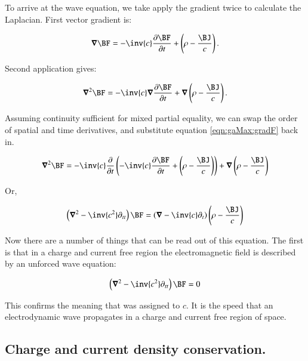 To arrive at the wave equation, we take apply the gradient twice to calculate the Laplacian.  First vector gradient is:

\begin{equation}\label{eqn:gaMax:gradF}
\spacegrad \BF = -\inv{c}\frac{\partial \BF}{\partial t} + \left(\rho - \frac{\BJ}{c}\right).
\end{equation}

Second application gives:

\begin{equation*}
\spacegrad^2 \BF = -\inv{c}\spacegrad\frac{\partial \BF}{\partial t} + \spacegrad \left(\rho - \frac{\BJ}{c}\right).
\end{equation*}

Assuming continuity sufficient for mixed partial equality, we can swap the order of spatial and time derivatives, and
substitute equation \ref{eqn:gaMax:gradF} back in.

\begin{align*}
\spacegrad^2 \BF 
&= -\inv{c}\frac{\partial}{\partial t}\left( -\inv{c}\frac{\partial \BF}{\partial t} + \left(\rho - \frac{\BJ}{c}\right) \right) + \spacegrad \left(\rho - \frac{\BJ}{c}\right) \\
\end{align*}

Or,

\begin{equation} \label{eqn:gaMax:wave}
\left(\spacegrad^2 - \inv{c^2}\partial_{tt} \right)\BF = \left(\spacegrad - \inv{c}\partial_{t} \right) \left(\rho - \frac{\BJ}{c}\right) 
\end{equation}

Now there are a number of things that can be read out of this equation.  The first is that in a charge and current free region the electromagnetic field is described by an unforced wave equation:

\begin{equation}
\left(\spacegrad^2 - \inv{c^2}\partial_{tt} \right)\BF = 0
\end{equation}

This confirms the meaning that was assigned to $c$.
It is the speed that an electrodynamic wave propagates in a charge and current free region of space.

\subsection{Charge and current density conservation. }

